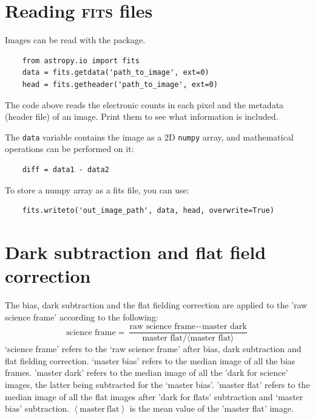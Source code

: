 \documentclass[a4paper, 11pt, fleqn]{memoir}
\begin{document}
\section{Reading \textsc{fits} files}
\label{sec:reading-fits-files}

Images can be read with the  package.
\begin{verbatim}
    from astropy.io import fits
    data = fits.getdata('path_to_image', ext=0)
    head = fits.getheader('path_to_image', ext=0)
\end{verbatim}
The code above reads the electronic counts in each pixel and the metadata (header file) of an image.
Print them to see what information is included.

The \texttt{data} variable contains the image as a 2D \texttt{numpy} array, and mathematical operations can be performed on it:
\begin{verbatim}
    diff = data1 - data2
\end{verbatim}

To store a numpy array as a fits file, you can use:
\begin{verbatim}
    fits.writeto('out_image_path', data, head, overwrite=True)
\end{verbatim}

\section{Dark subtraction and flat field correction}
\label{ssec:dark-flat-correction}


The bias, dark subtraction and the flat fielding correction are applied to the 'raw science frame' according to the following:
\begin{equation}
    \label{eq:correction}
    \text{science frame} = \frac{\text{raw science frame} - \text{master dark} }{\text{master flat} / \langle \text{master flat} \rangle} 
\end{equation}
`science frame' refers to the `raw science frame' after bias, dark subtraction and flat fielding correction.
`master bias' refers to the median image of all the bias frames. 'master dark' refers to the median image of all the 'dark for science' images, the latter being subtracted for the `master bias'. 'master flat' refers to the median image of all the flat images after 'dark for flats' subtraction and `master bias' subtraction. $ \left \langle \mathrm{master\ flat} \right \rangle$ is the mean value of the 'master flat' image.
\end{document}

